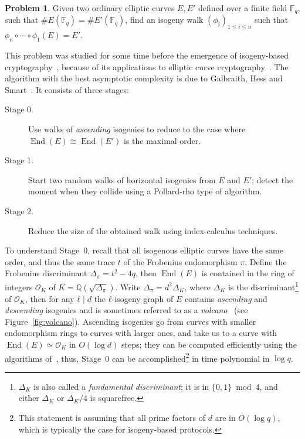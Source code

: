 \documentclass{article}
\newcommand{\F}{\mathbb{F}}
\renewcommand{\O}{\mathcal{O}}
\theoremstyle{definition}
\newtheorem{prob}[theorem]{Problem}
\DeclareMathOperator{\End}{End}
\begin{document}
\begin{prob}
\label{prob:isog}
  Given two ordinary elliptic curves $E,E'$ defined over a finite
  field $\F_q$, such that $\#E(\F_q)=\#E'(\F_q)$, find an isogeny walk
  $(ϕ_i)_{1≤i≤n}$ such that $ϕ_n∘\cdots∘ϕ_1(E)=E'$.
\end{prob}

This problem was studied for some time before the emergence of
isogeny-based cryptography~\cite{Gal,GHS,galbraith+stolbunov11},
because of its applications to elliptic curve
cryptography~\cite{GHS,teske06,jao+miller+venkatesan09}.  The
algorithm with the best asymptotic complexity is due to Galbraith,
Hess and Smart~\cite{GHS}. It consists of three stages:
\begin{description}
\item[Stage 0.] Use walks of \emph{ascending} isogenies to reduce to the case where
  $\End(E)\cong\End(E')$ is the maximal order.
\item[Stage 1.] Start two random walks of horizontal isogenies 
  from $E$ and $E'$; detect the
  moment when they collide using a Pollard-rho type of algorithm.
\item[Stage 2.] Reduce the size of the obtained walk using
  index-calculus techniques.
\end{description}

To understand Stage~0, recall that all isogenous elliptic curves have
the same order, and thus the same trace $t$ of the Frobenius
endomorphism $π$. Define the Frobenius discriminant $Δ_π=t^2-4q$, then
$\End(E)$ is contained in the ring of integers $\O_K$ of
$K=ℚ(\sqrt{Δ_π})$. Write $Δ_π=d^2Δ_K$, where $Δ_K$ is the
discriminant\footnote{$Δ_K$ is also called a \emph{fundamental
    discriminant}; it is in $\{0,1\}\bmod 4$, and either $Δ_K$ or
  $Δ_K/4$ is squarefree.} of $\O_K$, then for any $ℓ\mid d$ the
$ℓ$-isogeny graph of $E$ contains \emph{ascending} and
\emph{descending} isogenies and is sometimes referred to as a
\emph{volcano}~\cite{fouquet+morain02} (see Figure~\ref{fig:volcano}).
Ascending isogenies go from curves with smaller endomorphism rings to
curves with larger ones, and take us to a curve with $\End(E)≃\O_K$ in
$O(\log d)$ steps; they can be computed efficiently using the
algorithms
of~\cite{kohel,fouquet+morain02,ionica+joux13,defeo2016explicit},
thus, Stage~0 can be accomplished\footnote{This statement is assuming
  that all prime factors of $d$ are in $O(\log q)$, which is typically
  the case for isogeny-based protocols.}  in time polynomial in
$\log q$.
\end{document}
